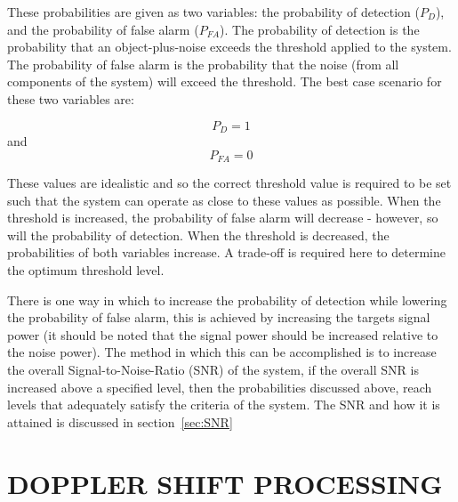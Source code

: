 \documentclass[11pt]{witseiepaper}
\begin{document}
\begin{bibunit}[witseie]
These probabilities are given as two variables: the probability of detection ($P_{D}$), and the probability of false alarm ($P_{FA}$). The probability of detection is the probability that an object-plus-noise exceeds the threshold applied to the system. The probability of false alarm is the probability that the noise (from all components of the system) will exceed the threshold.
The best case scenario for these two variables are: 

\begin{equation} \label{eqn:ProbabilityDetection}
P_{D} = 1
\end{equation} 
and 
\begin{equation} \label{eqn:ProbabilityFalseAlarm}
P_{FA} = 0
\end{equation}

These values are idealistic and so the correct threshold value is required to be set such that the system can operate as close to these values as possible.
When the threshold is increased, the probability of false alarm will decrease - however, so will the probability of detection. When the threshold is decreased, the probabilities of both variables increase. A trade-off is required here to determine the optimum threshold level.

There is one way in which to increase the probability of detection while lowering the probability of false alarm, this is achieved by increasing the targets signal power (it should be noted that the signal power should be increased relative to the noise power). The method in which this can be accomplished is to increase the overall Signal-to-Noise-Ratio (SNR) of the system, if the overall SNR is increased above a specified level, then the probabilities discussed above, reach levels that adequately satisfy the criteria of the system. The SNR and how it is attained is discussed in section~\ref{sec:SNR}

\section{DOPPLER SHIFT PROCESSING} \label{sec:DopplerShiftProcessing}


\end{bibunit}
\end{document}
